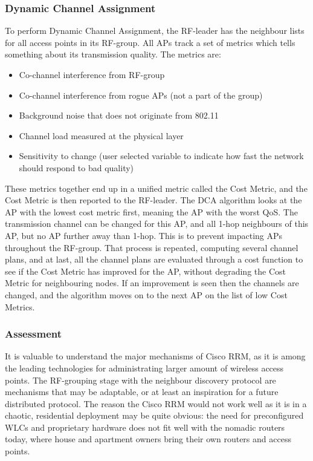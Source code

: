 \subsubsection{Dynamic Channel Assignment}
To perform Dynamic Channel Assignment, the RF-leader has the neighbour lists for all access points in 
its RF-group. All APs track a set of metrics which tells something about its transmission quality. The metrics are: 
\begin{itemize}
	\item Co-channel interference from RF-group
	\item Co-channel interference from rogue APs (not a part of the group)
	\item Background noise that does not originate from 802.11
	\item Channel load measured at the physical layer
	\item Sensitivity to change (user selected variable to indicate how fast the network should respond to bad quality)
\end{itemize}
These metrics together end up in a unified metric called the Cost Metric, and the Cost Metric is then reported to the RF-leader. 
The DCA algorithm looks at the AP with the lowest cost metric first, meaning the AP with the worst QoS. The transmission channel can be changed for
this AP, and all 1-hop neighbours of this AP, but no AP further away than 1-hop. This is to prevent impacting APs throughout the RF-group.
That process is repeated, computing several channel plans, and at last, all the channel plans are evaluated through a cost function
to see if the Cost Metric has improved for the AP, without degrading the Cost Metric for neighbouring nodes. If an improvement is seen
then the channels are changed, and the algorithm moves on to the next AP on the list of low Cost Metrics.  

\subsubsection{Assessment}
It is valuable to understand the major mechanisms of Cisco RRM, as it is among the leading technologies for administrating larger amount of wireless access points. 
The RF-grouping stage with the neighbour discovery protocol are mechanisms that may be adaptable, or at least an inspiration for a future distributed protocol. The reason 
the Cisco RRM would not work well as it is in a chaotic, residential deployment may be quite obvious: the need for preconfigured WLCs and proprietary hardware does not fit well with the nomadic 
routers today, where house and apartment owners bring their own routers and access points. 

